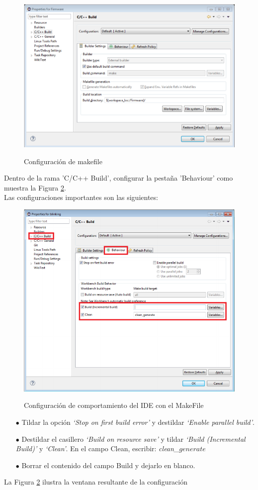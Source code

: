 \documentclass[12pt,letterpaper]{article}
\begin{document}
\begin{center}
\begin{figure}[!h]
\centering
\includegraphics[width=8 cm]{figuras/primer_proy7.png}\\
\caption{Configuración de makefile}
\label{primer_proy7}
\end{figure}
\end{center}

Dentro de la rama 'C/C++ Build', configurar la pestaña 'Behaviour' como muestra la Figura \ref{primer_proy8}.\\
Las configuraciones importantes son las siguientes:

\begin{center}
\begin{figure}[!h]
\centering
\includegraphics[width=10 cm]{figuras/primer_proy8.png}\\
\caption{Configuración de comportamiento del IDE con el MakeFile}
\label{primer_proy8}
\end{figure}
\end{center}


\begin{enumerate}
\item[$\bullet$] Tildar la opción \textit{‘Stop on first build error’} y destildar \textit{‘Enable parallel build’}.
\item[$\bullet$]Destildar el casillero \textit{‘Build on resource save’} y tildar \textit{‘Build (Incremental Build)’} y \textit{‘Clean’}. En el campo Clean, escribir: \textit{clean\_$generate$}
\item[$\bullet$]Borrar el contenido del campo Build y dejarlo en blanco.
\end{enumerate}
La Figura \ref{primer_proy8} ilustra la ventana resultante de la configuración
\end{document}
